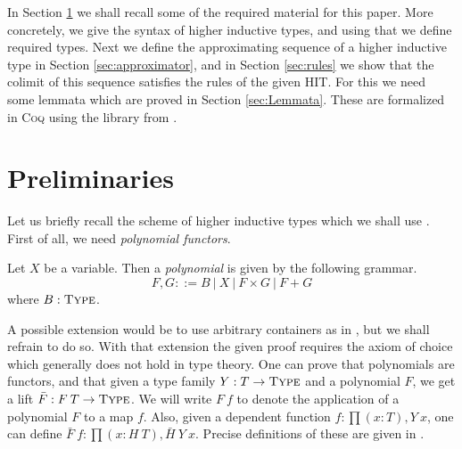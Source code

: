 \documentclass[a4paper,UKenglish]{lipics-v2016}
\newcommand{\Type}[0]{\operatorname{\textsc{Type}}}
\begin{document}
In Section \ref{sec:prelims} we shall recall some of the required material for this paper.
More concretely, we give the syntax of higher inductive types, and using that we define required types.
Next we define the approximating sequence of a higher inductive type in Section \ref{sec:approximator}, and in Section \ref{sec:rules} we show that the colimit of this sequence satisfies the rules of the given HIT.
For this we need some lemmata which are proved in Section \ref{sec:Lemmata}.
These are formalized in \textsc{Coq} \cite{CoqImpl} using the library from \cite{bauer2016hott}.

\section{Preliminaries}
\label{sec:prelims}
Let us briefly recall the scheme of higher inductive types which we shall use \cite{basoldhigher}.
First of all, we need \emph{polynomial functors}.
\begin{definition}
Let $X$ be a variable.
Then a \emph{polynomial} is given by the following grammar.
\[
F, G ::= B \ | \ X \ | \ F \times G \ | \ F + G
\]
where $B : \Type$.
\end{definition}
A possible extension would be to use arbitrary containers as in \cite{abbott2005containers}, but we shall refrain to do so.
With that extension the given proof requires the axiom of choice which generally does not hold in type theory.
One can prove that polynomials are functors, and that given a type family $Y : T \rightarrow \Type$ and a polynomial $F$, we get a lift $\bar{F} : F \> T \rightarrow \Type$.
We will write $F \> f$ to denote the application of a polynomial $F$ to a map $f$.
Also, given a dependent function $f : \prod (x : T), Y \> x$, one can define $\bar{F} \> f : \prod (x : H \> T), \bar{H} \> Y \> x$.
Precise definitions of these are given in \cite{basoldhigher}.
\end{document}
